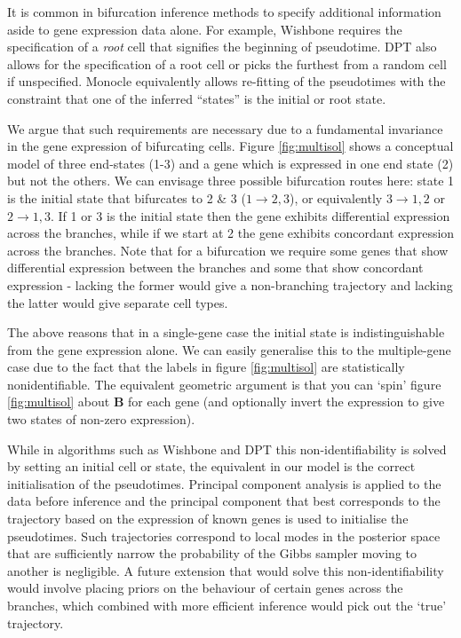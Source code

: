 It is common in bifurcation inference methods to specify additional information aside to gene expression data alone.
For example, Wishbone requires the specification of a \emph{root} cell that signifies the beginning of pseudotime. %
DPT also allows for the specification of a root cell or picks the furthest from a random cell if unspecified.
Monocle equivalently allows re-fitting of the pseudotimes with the constraint that one of the inferred ``states'' is the initial or root state.

We argue that such requirements are necessary due to a fundamental invariance in the gene expression of bifurcating cells. Figure \ref{fig:multisol} shows a conceptual model of three end-states (1-3) and a  gene which is expressed in one end state (2) but not the others. We can envisage three possible bifurcation routes here: state 1 is the initial state that bifurcates to 2 \& 3 ($1 \rightarrow 2,3$), or equivalently $3 \rightarrow 1,2$ or $2 \rightarrow 1,3$. If 1 or 3 is the initial state then the gene exhibits differential expression across the branches, while if we start at 2 the gene exhibits concordant expression across the branches. Note that for a bifurcation we require some genes that show differential expression between the branches and some that show concordant expression - lacking the former would give a non-branching trajectory and lacking the latter would give separate cell types.

The above reasons that in a single-gene case the initial state is indistinguishable from the gene expression alone. We can easily generalise this to the multiple-gene case due to the fact that the labels in figure \ref{fig:multisol} are statistically nonidentifiable. The equivalent geometric argument is that you can `spin' figure \ref{fig:multisol} about \textbf{B} for each gene (and optionally invert the expression to give two states of non-zero expression).

While in algorithms such as Wishbone and DPT this non-identifiability is solved by setting an initial cell or state, the equivalent in our model is the correct initialisation of the pseudotimes. Principal component analysis is applied to the data before inference and the principal component that best corresponds to the trajectory based on the expression of known genes is used to initialise the pseudotimes. Such trajectories correspond to local modes in the posterior space that are sufficiently narrow the probability of the Gibbs sampler moving to another is negligible. A future extension that would solve this non-identifiability would involve placing priors on the behaviour of certain genes across the branches, which combined with more efficient inference would pick out the `true' trajectory.


